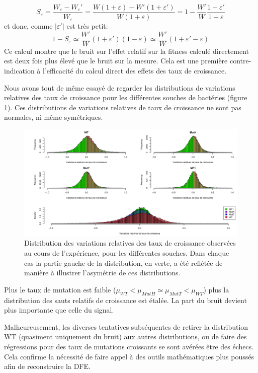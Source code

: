 \documentclass[12pt]{article}
\newcommand{\abs}[1]{\left|#1\right|}
\begin{document}
\[S_\varepsilon=\frac{W_\varepsilon - W_\varepsilon'}{W_\varepsilon} 
= \frac{W(1+\varepsilon) - W'(1+\varepsilon')}{W(1+\varepsilon)}
= 1 - \frac{W'}{W}\frac{1+\varepsilon'}{1+\varepsilon}\]
et donc, comme $\abs{\varepsilon'}$ est très petit:
\[1 - S_\varepsilon \simeq \frac{W'}{W}(1+\varepsilon')(1-\varepsilon)\simeq \frac{W'}{W}(1+\varepsilon'-\varepsilon)\]
Ce calcul montre que le bruit sur l'effet relatif sur la fitness calculé directement est deux fois plus élevé que le bruit sur la mesure. Cela est une première contre-indication à l'efficacité du calcul direct des effets des taux de croissance.

Nous avons tout de même essayé de regarder les distributions de variations relatives des taux de croissance pour les différentes souches de bactéries (figure \ref{fig:VarRel}). Ces distributions de variations relatives de taux de croissance ne sont pas normales, ni même symétriques.

\begin{figure}[!h]
  \begin{center}
    \vspace{3mm}
    \includegraphics[scale=0.3]{../Img/Variations_relatives_GR.png}
  \end{center} 
  \caption{\label{fig:VarRel}Distribution des variations relatives des taux de croissance observées au cours de l'expérience, pour les différentes souches. Dans chaque cas la partie gauche de la distribution, en verte, a été reflétée de manière à illustrer l'asymétrie de ces distributions.}
\end{figure}

Plus le taux de mutation est faible ($\mu_{WT} < \mu_{MutH} \simeq \mu_{MutT} < \mu_{WT}$) plus la distribution des sauts relatifs de croissance est étalée. La part du bruit devient plus importante que celle du signal.

Malheureusement, les diverses tentatives subséquentes de retirer la distribution WT (quasiment uniquement du bruit) aux autres distributions, ou de faire des régressions pour des taux de mutations croissants se sont avérées être des échecs. Cela confirme la nécessité de faire appel à des outils mathématiques plus poussés afin de reconstruire la DFE.
\end{document}
